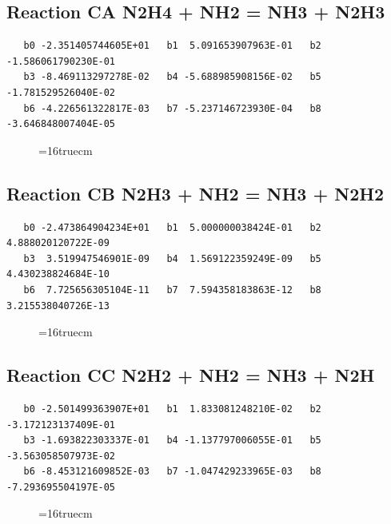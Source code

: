 \documentclass[12pt,dvipdfm]{article}
\begin{document}
\subsection{
Reaction CA N2H4 + NH2 = NH3 + N2H3 }
\begin{small}\begin{verbatim}
   b0 -2.351405744605E+01   b1  5.091653907963E-01   b2 -1.586061790230E-01
   b3 -8.469113297278E-02   b4 -5.688985908156E-02   b5 -1.781529526040E-02
   b6 -4.226561322817E-03   b7 -5.237146723930E-04   b8 -3.646848007404E-05
\end{verbatim}\end{small}
\begin{figure}[h!] \label{n2rates}
\epsfxsize=16truecm
\end{figure}
\newpage

\subsection{
Reaction CB N2H3 + NH2 = NH3 + N2H2 }
\begin{small}\begin{verbatim}
   b0 -2.473864904234E+01   b1  5.000000038424E-01   b2  4.888020120722E-09
   b3  3.519947546901E-09   b4  1.569122359249E-09   b5  4.430238824684E-10
   b6  7.725656305104E-11   b7  7.594358183863E-12   b8  3.215538040726E-13
\end{verbatim}\end{small}
\begin{figure}[h!] \label{n2rates}
\epsfxsize=16truecm
\end{figure}
\newpage

\subsection{
Reaction CC N2H2 + NH2 = NH3 + N2H }
\begin{small}\begin{verbatim}
   b0 -2.501499363907E+01   b1  1.833081248210E-02   b2 -3.172123137409E-01
   b3 -1.693822303337E-01   b4 -1.137797006055E-01   b5 -3.563058507973E-02
   b6 -8.453121609852E-03   b7 -1.047429233965E-03   b8 -7.293695504197E-05
\end{verbatim}\end{small}
\begin{figure}[h!] \label{n2rates}
\epsfxsize=16truecm
\end{figure}
\newpage
\end{document}
